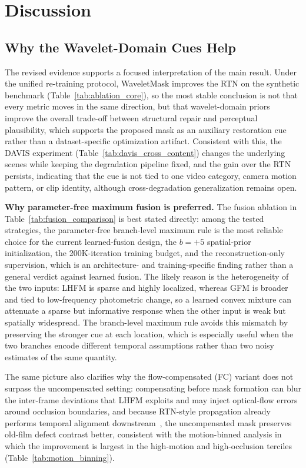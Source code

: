 \documentclass[applsci,article,submit,pdftex,moreauthors]{Definitions/mdpi}
\begin{document}
\section{Discussion}\label{sec:discussion}

\subsection{Why the Wavelet-Domain Cues Help}\label{subsec:fusion_insight}\label{subsec:freq_complement}\label{subsec:wavelet_choice}

The revised evidence supports a focused interpretation of the main result. Under the unified re-training protocol, WaveletMask improves the RTN on the synthetic benchmark (Table~\ref{tab:ablation_core}), so the most stable conclusion is not that every metric moves in the same direction, but that wavelet-domain priors improve the overall trade-off between structural repair and perceptual plausibility, which supports the proposed mask as an auxiliary restoration cue rather than a dataset-specific optimization artifact. Consistent with this, the DAVIS experiment (Table~\ref{tab:davis_cross_content}) changes the underlying scenes while keeping the degradation pipeline fixed, and the gain over the RTN persists, indicating that the cue is not tied to one video category, camera motion pattern, or clip identity, although cross-degradation generalization remains open.

\textbf{Why parameter-free maximum fusion is preferred.}
The fusion ablation in Table~\ref{tab:fusion_comparison} is best stated directly: among the tested strategies, the parameter-free branch-level maximum rule is the most reliable choice for the current learned-fusion design, the $b=+5$ spatial-prior initialization, the 200K-iteration training budget, and the reconstruction-only supervision, which is an architecture- and training-specific finding rather than a general verdict against learned fusion. The likely reason is the heterogeneity of the two inputs: LHFM is sparse and highly localized, whereas GFM is broader and tied to low-frequency photometric change, so a learned convex mixture can attenuate a sparse but informative response when the other input is weak but spatially widespread. The branch-level maximum rule avoids this mismatch by preserving the stronger cue at each location, which is especially useful when the two branches encode different temporal assumptions rather than two noisy estimates of the same quantity.

The same picture also clarifies why the flow-compensated (FC) variant does not surpass the uncompensated setting: compensating before mask formation can blur the inter-frame deviations that LHFM exploits and may inject optical-flow errors around occlusion boundaries, and because RTN-style propagation already performs temporal alignment downstream~\cite{rtn2022,rrtn2024}, the uncompensated mask preserves old-film defect contrast better, consistent with the motion-binned analysis in which the improvement is largest in the high-motion and high-occlusion terciles (Table~\ref{tab:motion_binning}).
\end{document}
